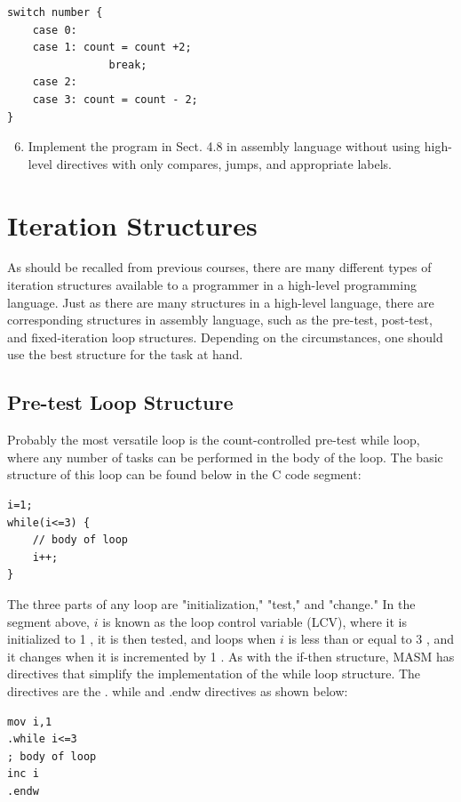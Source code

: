 \documentclass[10pt]{book}
\begin{document}
\begin{verbatim}
switch number {
    case 0:
    case 1: count = count +2;
                break;
    case 2:
    case 3: count = count - 2;
}
\end{verbatim}

\begin{enumerate}
  \setcounter{enumi}{5}
  \item Implement the program in Sect. 4.8 in assembly language without using high-level directives with only compares, jumps, and appropriate labels.
\end{enumerate}

\section{Iteration Structures}
As should be recalled from previous courses, there are many different types of iteration structures available to a programmer in a high-level programming language. Just as there are many structures in a high-level language, there are corresponding structures in assembly language, such as the pre-test, post-test, and fixed-iteration loop structures. Depending on the circumstances, one should use the best structure for the task at hand.

\subsection{Pre-test Loop Structure}
Probably the most versatile loop is the count-controlled pre-test while loop, where any number of tasks can be performed in the body of the loop. The basic structure of this loop can be found below in the C code segment:

\begin{verbatim}
i=1;
while(i<=3) {
    // body of loop
    i++;
}
\end{verbatim}

The three parts of any loop are "initialization," "test," and "change." In the segment above, $i$ is known as the loop control variable (LCV), where it is initialized to 1 , it is then tested, and loops when $i$ is less than or equal to 3 , and it changes when it is incremented by 1 . As with the if-then structure, MASM has directives that simplify the implementation of the while loop structure. The directives are the . while and .endw directives as shown below:

\begin{verbatim}
mov i,1
.while i<=3
; body of loop
inc i
.endw
\end{verbatim}
\end{document}
